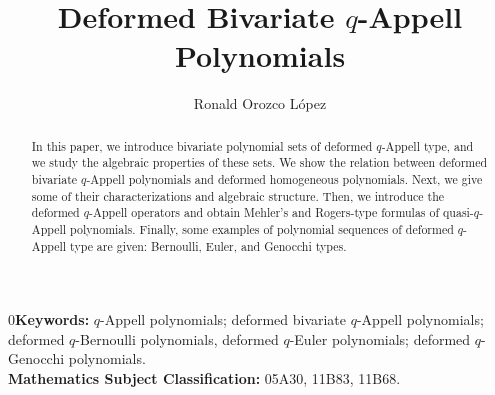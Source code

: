 \documentclass[12pt]{article}
\title{\textbf{Deformed Bivariate $q$-Appell Polynomials}}
\author{Ronald Orozco L\'opez}
\begin{document}
\maketitle


\begin{abstract}
In this paper, we introduce bivariate polynomial sets of deformed $q$-Appell type, and we study the algebraic properties of these sets. We show the relation between deformed bivariate $q$-Appell polynomials and deformed homogeneous polynomials. Next, we give some of their characterizations and algebraic structure. Then, we introduce the deformed $q$-Appell operators and obtain Mehler's and Rogers-type formulas of quasi-$q$-Appell polynomials. Finally, some examples of polynomial sequences of deformed $q$-Appell type are given: Bernoulli, Euler, and Genocchi types.
\end{abstract}
0{\bf Keywords:} $q$-Appell polynomials; deformed bivariate $q$-Appell polynomials; deformed $q$-Bernoulli polynomials, deformed $q$-Euler polynomials; deformed $q$-Genocchi polynomials.\\
{\bf Mathematics Subject Classification:} 05A30, 11B83, 11B68.
\end{document}
